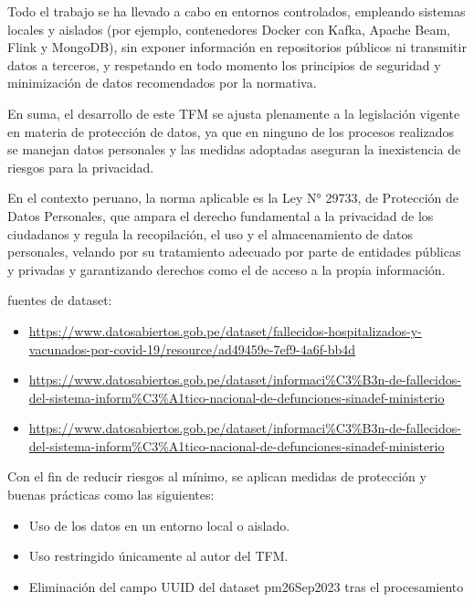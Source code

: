 \documentclass[12pt,a4paper]{article}
\providecommand{\tightlist}{%
  \setlength{\itemsep}{0pt}\setlength{\parskip}{0pt}}
\begin{document}
Todo el trabajo se ha llevado a cabo en entornos controlados, empleando sistemas locales y aislados (por ejemplo, contenedores Docker con Kafka, Apache Beam, Flink y MongoDB), sin exponer información en repositorios públicos ni transmitir datos a terceros, y respetando en todo momento los principios de seguridad y minimización de datos recomendados por la normativa.

En suma, el desarrollo de este TFM se ajusta plenamente a la legislación vigente en materia de protección de datos, ya que en ninguno de los procesos realizados se manejan datos personales y las medidas adoptadas aseguran la inexistencia de riesgos para la privacidad.

En el contexto peruano, la norma aplicable es la Ley N° 29733, de Protección de Datos Personales, que ampara el derecho fundamental a la privacidad de los ciudadanos y regula la recopilación, el uso y el almacenamiento de datos personales, velando por su tratamiento adecuado por parte de entidades públicas y privadas y garantizando derechos como el de acceso a la propia información.

fuentes de dataset:

\begin{itemize}
    \tightlist
    \item \url{https://www.datosabiertos.gob.pe/dataset/fallecidos-hospitalizados-y-vacunados-por-covid-19/resource/ad49459e-7ef9-4a6f-bb4d}
    \item \url{https://www.datosabiertos.gob.pe/dataset/informaci\%C3\%B3n-de-fallecidos-del-sistema-inform\%C3\%A1tico-nacional-de-defunciones-sinadef-ministerio}
    \item \url{https://www.datosabiertos.gob.pe/dataset/informaci\%C3\%B3n-de-fallecidos-del-sistema-inform\%C3\%A1tico-nacional-de-defunciones-sinadef-ministerio}
\end{itemize}

Con el fin de reducir riesgos al mínimo, se aplican medidas de protección
y buenas prácticas como las siguientes:

\begin{itemize}
    \tightlist
    \item Uso de los datos en un entorno local o aislado.
    \item Uso restringido únicamente al autor del TFM.
    \item Eliminación del campo UUID del dataset pm26Sep2023 tras el procesamiento
\end{itemize}
\end{document}
